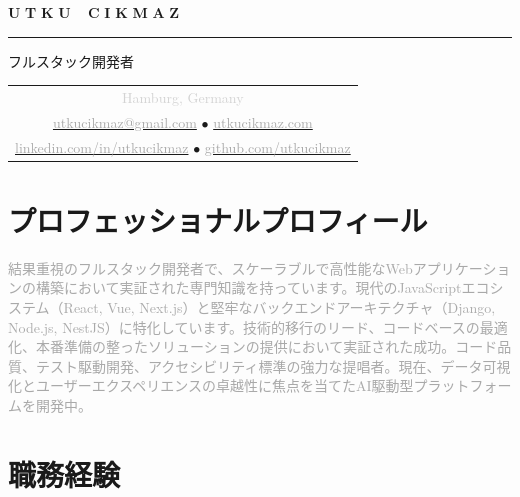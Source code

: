 \documentclass[10pt,a4paper]{article}
\newcommand{\gradientname}[1]{%
  \textcolor{darkgray!90}{\Huge\bfseries U}%
  \textcolor{darkgray!80}{\Huge\bfseries T}%
  \textcolor{darkgray!70}{\Huge\bfseries K}%
  \textcolor{darkgray!60}{\Huge\bfseries U}%
  \textcolor{mediumgray!90}{\Huge\bfseries\ }%
  \textcolor{mediumgray!80}{\Huge\bfseries C}%
  \textcolor{mediumgray!70}{\Huge\bfseries I}%
  \textcolor{mediumgray!60}{\Huge\bfseries K}%
  \textcolor{mediumgray!50}{\Huge\bfseries M}%
  \textcolor{lightgray!80}{\Huge\bfseries A}%
  \textcolor{lightgray!70}{\Huge\bfseries Z}%
}
\begin{document}
\color{black}
\pagestyle{empty}

\begin{center}
  \vspace{-3pt}
  \gradientname{UTKU CIKMAZ}
  
  \vspace{4pt}
  \textcolor{verylightgray}{\rule{0.35\textwidth}{0.6pt}}
  
  \vspace{4pt}
  {\large\color{mediumgray}フルスタック開発者}
  
  \vspace{5pt}
  \begin{tabular}{c}
    \textcolor{lightgray}{\small Hamburg, Germany} \\[2pt]
    \href{mailto:utkucikmaz@gmail.com}{\textcolor{darkgray}{utkucikmaz@gmail.com}} \quad
    \textcolor{verylightgray}{$\bullet$} \quad
    \href{https://www.utkucikmaz.com}{\textcolor{darkgray}{utkucikmaz.com}} \\[1pt]
    \href{https://linkedin.com/in/utkucikmaz}{\textcolor{darkgray}{linkedin.com/in/utkucikmaz}} \quad
    \textcolor{verylightgray}{$\bullet$} \quad
    \href{https://github.com/utkucikmaz}{\textcolor{darkgray}{github.com/utkucikmaz}}
  \end{tabular}
\end{center}

\vspace{1pt}

\section*{プロフェッショナルプロフィール}
\vspace{0pt}
\textcolor{darkgray}{%
結果重視のフルスタック開発者で、スケーラブルで高性能なWebアプリケーションの構築において実証された専門知識を持っています。現代のJavaScriptエコシステム（React, Vue, Next.js）と堅牢なバックエンドアーキテクチャ（Django, Node.js, NestJS）に特化しています。技術的移行のリード、コードベースの最適化、本番準備の整ったソリューションの提供において実証された成功。コード品質、テスト駆動開発、アクセシビリティ標準の強力な提唱者。現在、データ可視化とユーザーエクスペリエンスの卓越性に焦点を当てたAI駆動型プラットフォームを開発中。
}
\vspace{1pt}

\section*{職務経験}
\end{document}
